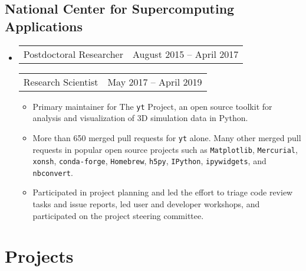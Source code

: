 \documentclass[10pt,letterpaper]{article}
\newcommand{\textline}[2]{
  \begin{tabularx}{\textwidth}{XY}
  #1 & #2
  \end{tabularx}
}
\begin{document}
\subsection*{National Center for Supercomputing Applications}
\begin{itemize}
  \item[] \textline{Postdoctoral Researcher}{August 2015 -- April 2017}  \textline{Research
    Scientist}{May 2017 -- April 2019} %
  \begin{itemize}
    \item Primary maintainer for The \texttt{yt} Project, an open source toolkit
      for analysis and visualization of 3D simulation data in Python.
    \item More than 650 merged pull requests for \texttt{yt} alone. Many
      other merged pull requests in popular open source projects such as
      \texttt{Matplotlib}, \texttt{Mercurial}, \texttt{xonsh},
      \texttt{conda-forge}, \texttt{Homebrew}, \texttt{h5py}, \texttt{IPython},
      \texttt{ipywidgets}, and \texttt{nbconvert}.
    \item Participated in project planning and led the effort to triage code
      review tasks and issue reports, led user and developer workshops, and
      participated on the project steering committee.
  \end{itemize}

\end{itemize}

\section*{Projects}
\end{document}
